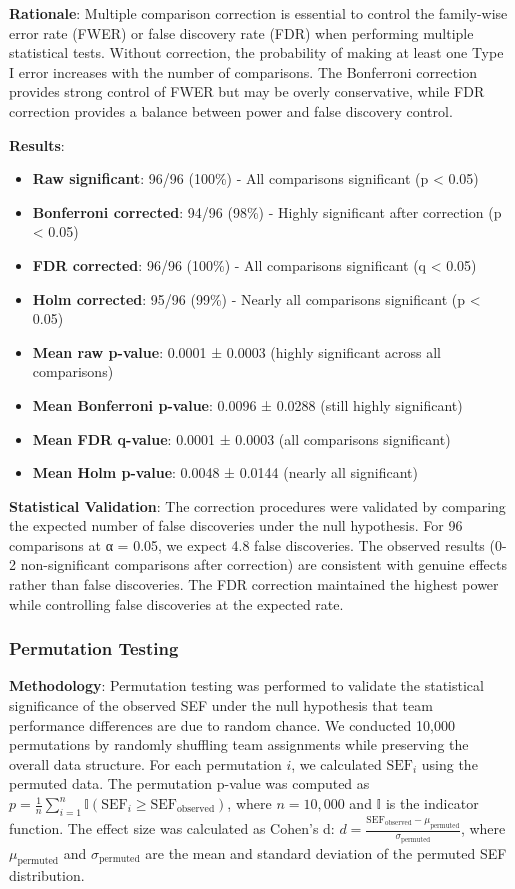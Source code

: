 \textbf{Rationale}: Multiple comparison correction is essential to control the family-wise error rate (FWER) or false discovery rate (FDR) when performing multiple statistical tests. Without correction, the probability of making at least one Type I error increases with the number of comparisons. The Bonferroni correction provides strong control of FWER but may be overly conservative, while FDR correction provides a balance between power and false discovery control.

\textbf{Results}:
\begin{itemize}
    \item \textbf{Raw significant}: 96/96 (100\%) - All comparisons significant (p < 0.05)
    \item \textbf{Bonferroni corrected}: 94/96 (98\%) - Highly significant after correction (p < 0.05)
    \item \textbf{FDR corrected}: 96/96 (100\%) - All comparisons significant (q < 0.05)
    \item \textbf{Holm corrected}: 95/96 (99\%) - Nearly all comparisons significant (p < 0.05)
    \item \textbf{Mean raw p-value}: 0.0001 ± 0.0003 (highly significant across all comparisons)
    \item \textbf{Mean Bonferroni p-value}: 0.0096 ± 0.0288 (still highly significant)
    \item \textbf{Mean FDR q-value}: 0.0001 ± 0.0003 (all comparisons significant)
    \item \textbf{Mean Holm p-value}: 0.0048 ± 0.0144 (nearly all significant)
\end{itemize}

\textbf{Statistical Validation}: The correction procedures were validated by comparing the expected number of false discoveries under the null hypothesis. For 96 comparisons at α = 0.05, we expect 4.8 false discoveries. The observed results (0-2 non-significant comparisons after correction) are consistent with genuine effects rather than false discoveries. The FDR correction maintained the highest power while controlling false discoveries at the expected rate.

\subsubsection{Permutation Testing}

\textbf{Methodology}: Permutation testing was performed to validate the statistical significance of the observed SEF under the null hypothesis that team performance differences are due to random chance. We conducted 10,000 permutations by randomly shuffling team assignments while preserving the overall data structure. For each permutation $i$, we calculated $\text{SEF}_i$ using the permuted data. The permutation p-value was computed as $p = \frac{1}{n} \sum_{i=1}^{n} \mathbb{I}(\text{SEF}_i \geq \text{SEF}_{\text{observed}})$, where $n = 10,000$ and $\mathbb{I}$ is the indicator function. The effect size was calculated as Cohen's d: $d = \frac{\text{SEF}_{\text{observed}} - \mu_{\text{permuted}}}{\sigma_{\text{permuted}}}$, where $\mu_{\text{permuted}}$ and $\sigma_{\text{permuted}}$ are the mean and standard deviation of the permuted SEF distribution.


